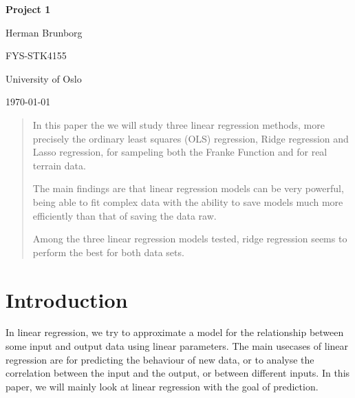 \documentclass[12pt]{article}
\begin{document}
\begin{titlepage}
   \begin{center}
        \vspace{2cm}

        {\LARGE \textbf{Project 1}}

        \vspace{3em}

        Herman Brunborg


        \vspace{0.5em}

        FYS-STK4155

        \vspace{0.5em}

        University of Oslo

        \vfill

        \today
   \end{center}
\end{titlepage}

\tableofcontents

\newpage

\begin{abstract}
    In this paper the we will study three linear regression methods, more precisely the ordinary least squares (OLS) regression, Ridge regression and Lasso regression, for sampeling both the Franke Function and for real terrain data. 

    The main findings are that linear regression models can be very powerful, being able to fit complex data with the ability to save models much more efficiently than that of saving the data raw.

    Among the three linear regression models tested, ridge regression seems to perform the best for both data sets.
\end{abstract}

\section{Introduction}

In linear regression, we try to approximate a model for the relationship between some input and output data using linear parameters.
The main usecases of linear regression are for predicting the behaviour of new data, or to analyse the correlation between the input and the output, or between different inputs.
In this paper, we will mainly look at linear regression with the goal of prediction.
\end{document}
